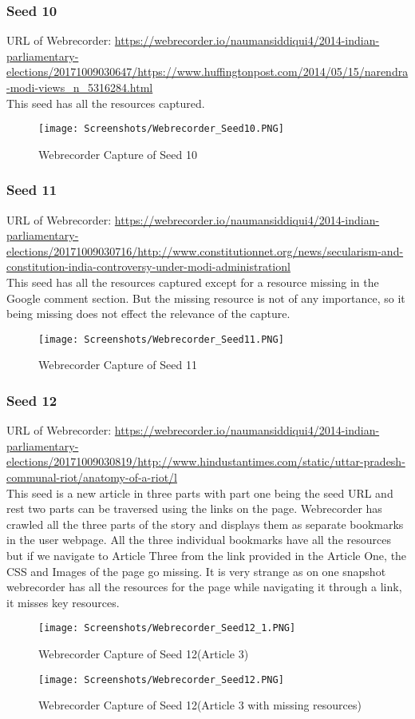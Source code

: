 \documentclass[11pt,journal,compsoc,onecolumn]{IEEEtran}
\begin{document}
\subsubsection{Seed 10}
URL of Webrecorder: 
\url{https://webrecorder.io/naumansiddiqui4/2014-indian-parliamentary-elections/20171009030647/https://www.huffingtonpost.com/2014/05/15/narendra-modi-views_n_5316284.html}\\
This seed has all the resources captured.
 \begin{figure}[ht] 
  \centering
  \texttt{[image: Screenshots/Webrecorder\_Seed10.PNG]}
  \caption{Webrecorder Capture of Seed 10}
  \label{fig:13}
\end{figure}
\subsubsection{Seed 11}
URL of Webrecorder: 
\url{https://webrecorder.io/naumansiddiqui4/2014-indian-parliamentary-elections/20171009030716/http://www.constitutionnet.org/news/secularism-and-constitution-india-controversy-under-modi-administrationl}\\
This seed has all the resources captured except for a resource missing in the Google comment section. But the missing resource is not of any importance, so it being missing does not effect the relevance of the capture.
 \begin{figure}[ht] 
  \centering
  \texttt{[image: Screenshots/Webrecorder\_Seed11.PNG]}
  \caption{Webrecorder Capture of Seed 11}
  \label{fig:14}
\end{figure}
\subsubsection{Seed 12}
URL of Webrecorder: 
\url{https://webrecorder.io/naumansiddiqui4/2014-indian-parliamentary-elections/20171009030819/http://www.hindustantimes.com/static/uttar-pradesh-communal-riot/anatomy-of-a-riot/l}\\
This seed is a new article in three parts with part one being the seed URL and rest two parts can be traversed using the links on the page. Webrecorder has crawled all the three parts of the story and displays them as separate bookmarks in the user webpage. All the three individual bookmarks have all the resources but if we navigate to Article Three from the link provided in the Article One, the CSS and Images of the page go missing. It is very strange as on one snapshot webrecorder has all the resources for the page while navigating it through a link, it misses key resources. 
 \begin{figure}[ht] 
  \centering
  \texttt{[image: Screenshots/Webrecorder\_Seed12\_1.PNG]}
  \caption{Webrecorder Capture of Seed 12(Article 3)}
  \label{fig:15}
\end{figure}
 \begin{figure}[ht] 
  \centering
  \texttt{[image: Screenshots/Webrecorder\_Seed12.PNG]}
  \caption{Webrecorder Capture of Seed 12(Article 3 with missing resources)}
  \label{fig:16}
\end{figure}
\end{document}
